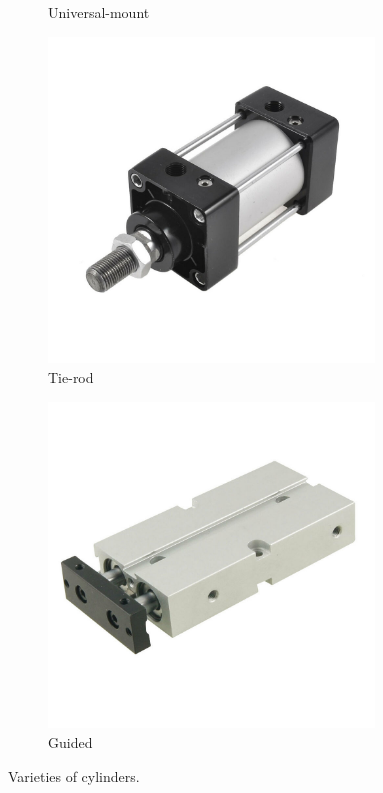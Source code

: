 \documentclass[10pt,letterpaper]{book}
\begin{document}
\begin{figure}[H]
\begin{subfigure}[b]{.24\linewidth}
		\caption{Universal-mount}
	\end{subfigure}
	\begin{subfigure}[b]{.24\linewidth}
		\includegraphics[width=0.95\textwidth]{imgs/piston_tierod.jpeg}
		\caption{Tie-rod}
	\end{subfigure}
	\begin{subfigure}[b]{.24\linewidth}
		\includegraphics[width=0.95\textwidth]{imgs/piston_stage.jpeg}
		\caption{Guided}
	\end{subfigure}
	
	\caption{Varieties of cylinders.}
\end{figure}
\end{document}
